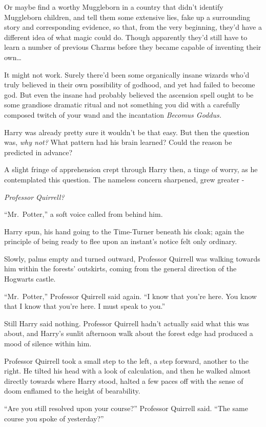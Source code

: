 Or maybe find a worthy Muggleborn in a country that didn't identify
Muggleborn children, and tell them some extensive lies, fake up a
surrounding story and corresponding evidence, so that, from the very
beginning, they'd have a different idea of what magic could do. Though
apparently they'd still have to learn a number of previous Charms before
they became capable of inventing their own\ldots{}

It might not work. Surely there'd been some organically insane wizards
who'd truly believed in their own possibility of godhood, and yet had
failed to become god. But even the insane had probably believed the
ascension spell ought to be some grandiose dramatic ritual and not
something you did with a carefully composed twitch of your wand and the
incantation \emph{Becomus Goddus.}

Harry was already pretty sure it wouldn't be that easy. But then the
question was, \emph{why not?} What pattern had his brain learned? Could
the reason be predicted in advance?

A slight fringe of apprehension crept through Harry then, a tinge of
worry, as he contemplated this question. The nameless concern sharpened,
grew greater -

\emph{Professor Quirrell?}

``Mr.~Potter,'' a soft voice called from behind him.

Harry spun, his hand going to the Time-Turner beneath his cloak; again
the principle of being ready to flee upon an instant's notice felt only
ordinary.

Slowly, palms empty and turned outward, Professor Quirrell was walking
towards him within the forests' outskirts, coming from the general
direction of the Hogwarts castle.

``Mr.~Potter,'' Professor Quirrell said again. ``I know that you're
here. You know that I know that you're here. I must speak to you.''

Still Harry said nothing. Professor Quirrell hadn't actually said what
this was about, and Harry's sunlit afternoon walk about the forest edge
had produced a mood of silence within him.

Professor Quirrell took a small step to the left, a step forward,
another to the right. He tilted his head with a look of calculation, and
then he walked almost directly towards where Harry stood, halted a few
paces off with the sense of doom enflamed to the height of bearability.

``Are you still resolved upon your course?'' Professor Quirrell said.
``The same course you spoke of yesterday?''

